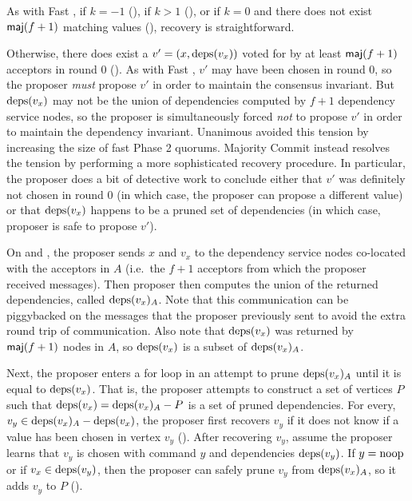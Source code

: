 

As with Fast \BPaxos{}, if $k = -1$ (), if $k
> 1$ (), or if $k = 0$ and there does not exist
$\textsf{maj}(f+1)$ matching values (), recovery is
straightforward.

Otherwise, there does exist a $v' = (x, \text{deps}(v_x))$ voted for by at least
$\textsf{maj}(f+1)$ acceptors in round $0$ (). As with Fast
\BPaxos{}, $v'$ may have been chosen in round $0$, so the proposer \emph{must}
propose $v'$ in order to maintain the consensus invariant. But $\text{deps}(v_x)$ may
not be the union of dependencies computed by $f+1$ dependency service nodes, so
the proposer is simultaneously forced \emph{not} to propose $v'$ in order to
maintain the dependency invariant. Unanimous \BPaxos{} avoided this tension by
increasing the size of fast Phase 2 quorums.  Majority Commit \BPaxos{} instead
resolves the tension by performing a more sophisticated recovery procedure.  In
particular, the proposer does a bit of detective work to conclude either that
$v'$ was definitely not chosen in round $0$ (in which case, the proposer can
propose a different value) or that $\text{deps}(v_x)$ happens to be a pruned set of
dependencies (in which case, proposer is safe to propose $v'$).

On  and
, the proposer sends $x$ and $v_x$ to
the dependency service nodes co-located with the acceptors in $A$ (i.e.\ the
$f+1$ acceptors from which the proposer received  messages).
Then proposer then computes the union of the returned dependencies, called
$\text{deps}(v_x)_A$. Note that this communication can be piggybacked on the
 messages that the proposer previously sent to avoid the extra
round trip of communication.
%
Also note that $\text{deps}(v_x)$ was returned by $\textsf{maj}(f+1)$ nodes in $A$, so
$\text{deps}(v_x)$ is a subset of $\text{deps}(v_x)_A$.

Next, the proposer enters a for loop in an attempt to prune $\text{deps}(v_x)_A$
until it is equal to $\text{deps}(v_x)$. That is, the proposer attempts to construct
a set of vertices $P$ such that $\text{deps}(v_x) = \text{deps}(v_x)_A - P$ is a set of
pruned dependencies. For every, $v_y \in \text{deps}(v_x)_A - \text{deps}(v_x)$, the
proposer first recovers $v_y$ if it does not know if a value has been chosen in
vertex $v_y$ (). After recovering $v_y$, assume the
proposer learns that $v_y$ is chosen with command $y$ and dependencies
$\text{deps}(v_y)$. If $y = \text{noop}$ or if $v_x \in \text{deps}(v_y)$, then the proposer can
safely prune $v_y$ from $\text{deps}(v_x)_A$, so it adds $v_y$ to $P$
().

